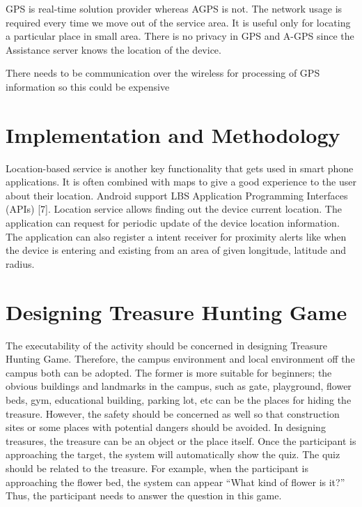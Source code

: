 	GPS is real-time solution provider whereas AGPS is not. 
	The network usage is required every time we move out of 
	the service area. It is useful only for locating a particular 
	place in small area. There is no privacy in GPS and A-GPS 
	since the Assistance server knows the location of the 
	device. 
	
	There needs to be communication over the wireless for 
	processing of GPS information so this could be expensive
	
	\section{Implementation and Methodology}
	
	Location-based service is another key functionality that 
	gets used in smart phone applications. It is often combined 
	with maps to give a good experience to the user about their 
	location. 
	Android support LBS Application Programming Interfaces 
	(APIs) [7]. Location service allows finding out the device 
	current location. The application can request for periodic 
	update of the device location information. The application 
	can also register a intent receiver for proximity alerts like 
	when the device is entering and existing from an area of 
	given longitude, latitude and radius.
	
	

	
	
	
	\section{Designing Treasure Hunting Game}
	
	The executability of the activity should be concerned in designing Treasure Hunting Game. Therefore, the campus environment and local environment off the campus both can be adopted. The former is more suitable for beginners; the obvious buildings and landmarks in the campus, such as gate, playground, flower beds, gym, educational building, parking lot, etc can be the places for hiding the treasure. However, the safety should be concerned as well so that construction sites or some places with potential dangers should be avoided. In designing treasures, the treasure can be an object or the place itself. Once the participant is approaching the target, the system will automatically show the quiz. The quiz should be related to the treasure. For example, when the participant is approaching the flower bed, the system can appear “What kind of flower is it?” Thus, the participant needs to answer the question in this game. 
	

